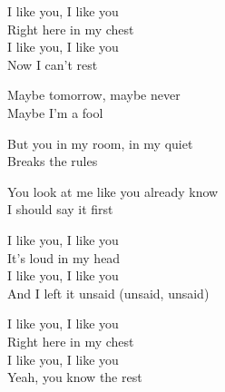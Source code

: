 \begin{lyrics}
I like you, I like you\\
Right here in my chest\\
I like you, I like you\\
Now I can't rest

Maybe tomorrow, maybe never\\
Maybe I'm a fool

But you in my room, in my quiet\\
Breaks the rules

You look at me like you already know\\
I should say it first

I like you, I like you\\
It's loud in my head\\
I like you, I like you\\
And I left it unsaid
(unsaid, unsaid)

I like you, I like you\\
Right here in my chest\\
I like you, I like you\\
Yeah, you know the rest
\end{lyrics}

